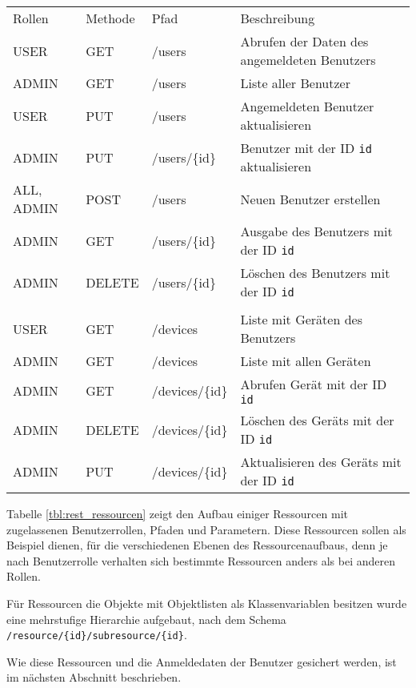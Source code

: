 \begin{minipage}[t]{\textwidth}
	\centering
	\begin{tabu}{>{\ttfamily}X[2]X[1]>{\ttfamily}X[3]>{\small}X[4]}
		\rowfont[l]{\normalfont\bfseries\normalsize}
		Rollen & Methode & Pfad &   Beschreibung\\
		USER & GET & /users &   Abrufen der Daten des angemeldeten Benutzers\\ 
		ADMIN & GET & /users &  Liste aller Benutzer\\
		USER & PUT & /users & Angemeldeten Benutzer aktualisieren\\
		ADMIN & PUT & /users/\{id\} & Benutzer mit der ID \texttt{id} aktualisieren\\ 
		ALL, ADMIN & POST & /users &  Neuen Benutzer erstellen\\
		ADMIN & GET & /users/\{id\} & Ausgabe des Benutzers mit der ID \texttt{id}\\
		ADMIN & DELETE & /users/\{id\} & Löschen des Benutzers mit der ID \texttt{id}\\
		\\
		USER & GET & /devices & Liste mit Geräten des Benutzers\\
		ADMIN & GET & /devices & Liste mit allen Geräten\\
		ADMIN & GET & /devices/\{id\} & Abrufen Gerät mit der ID \texttt{id}\\
		
		ADMIN & DELETE & /devices/\{id\} & Löschen des Geräts mit der ID \texttt{id}\\
		ADMIN & PUT & /devices/\{id\} & Aktualisieren des Geräts mit der ID \texttt{id}\\
	\end{tabu}
	\label{tbl:rest_ressourcen}
\end{minipage}

Tabelle \ref{tbl:rest_ressourcen} zeigt den Aufbau einiger Ressourcen mit zugelassenen Benutzerrollen, Pfaden und Parametern.
Diese Ressourcen sollen als Beispiel dienen, für die verschiedenen Ebenen des Ressourcenaufbaus, denn je nach Benutzerrolle verhalten sich bestimmte Ressourcen anders als bei anderen Rollen.

Für Ressourcen die Objekte mit Objektlisten als Klassenvariablen besitzen wurde eine mehrstufige Hierarchie aufgebaut, nach dem Schema \texttt{/resource/\{id\}/subresource/\{id\}}.

Wie diese Ressourcen und die Anmeldedaten der Benutzer gesichert werden, ist im nächsten Abschnitt beschrieben.

